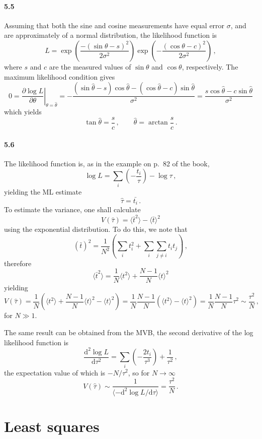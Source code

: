 \documentclass[a4paper,12pt]{article}
\def\d{\mathrm{d}}
\begin{document}
\paragraph{5.5} Assuming that both the sine and cosine measurements have equal error $\sigma$, and are approximately of a normal distribution, the likelihood function is
\[
 L = \exp\left(\frac{-(\sin\theta-s)^2}{2\sigma^2}\right)\exp\left(-\frac{(\cos\theta-c)^2}{2\sigma^2}\right)\,,
\]
where $s$ and $c$ are the measured values of $\sin\theta$ and $\cos\theta$, respectively. The maximum likelihood condition gives
\[
 0 =\left.\frac{\partial \log L}{\partial\theta}\right|_{\theta=\hat\theta} =-\frac{(\sin\hat\theta -s)\cos\hat\theta -(\cos\hat\theta-c)\sin\hat\theta}{\sigma^2} = \frac{s\cos\hat\theta - c\sin\hat\theta}{\sigma^2}
\]
which yields
\[
 \tan\hat\theta = \frac{s}{c}\,,\quad\quad \hat\theta = \arctan\frac{s}{c}\,.
\]



\paragraph{5.6} The likelihood function is, as in the example on p.\ 82 of the book,
\[
 \log L = \sum_i \left(-\frac{t_i}{\tau}\right)-\log\tau\,,
\]
yielding the ML estimate
\[
 \hat\tau = \bar{t_i}\,.
\]
To estimate the variance, one shall calculate
\[
 V(\hat\tau) = \langle \bar t^2\rangle - \langle \bar t\rangle^2
\]
using the exponential distribution. To do this, we note that
\[
 (\bar t)^2 = \frac{1}{N^2}\left(\sum_i t_i^2 + \sum_i \sum_{j\ne i}t_i t_j\right)\,,
\]
therefore
\[
 \langle \bar{t}^2\rangle = \frac{1}{N}\langle t^2 \rangle + \frac{N-1}{N}\langle t\rangle^2
\]
yielding
\[
 V(\hat\tau) = \frac{1}{N}\left(\langle t^2\rangle + \frac{N-1}{N}\langle t\rangle^2 -\langle t \rangle^2\right) = \frac{1}{N}\frac{N-1}{N}\left( \langle t^2\rangle - \langle t\rangle^2 \right) = \frac{1}{N}\frac{N-1}{N}\tau^2\sim \frac{\tau^2}{N}\,,
\]
for $N\gg 1$.

The same result can be obtained from the MVB, the second derivative of the log likelihood function is
\[
 \frac{\d^2 \log L}{\d\tau^2} = \sum_i \left( -\frac{2 t_i}{\tau^3}\right) + \frac{1}{\tau^2}\,,
\]
the expectation value of which is $-N/\tau^2$, so for $N\to\infty$
\[
 V(\hat\tau) \sim \frac{1}{\langle -\d^2 \log L/\d\tau\rangle} = \frac{\tau^2}{N}\,.
\]

\section{Least squares}
\end{document}
